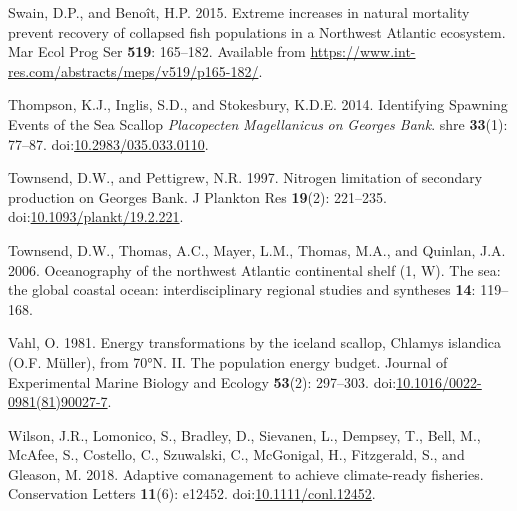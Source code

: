 \documentclass[
]{article}
\newlength{\cslhangindent}
\newlength{\cslentryspacingunit} %
\newenvironment{CSLReferences}[2] %
 {%
  \setlength{\parindent}{0pt}
  \ifodd #1
  \let\oldpar\par
  \def\par{\hangindent=\cslhangindent\oldpar}
  \fi
  \setlength{\parskip}{#2\cslentryspacingunit}
 }%
 {}
\begin{document}
\begin{CSLReferences}{1}{0}
\leavevmode{}%
Swain, D.P., and Benoît, H.P. 2015. Extreme increases in natural mortality prevent recovery of collapsed fish populations in a {Northwest Atlantic} ecosystem. Mar Ecol Prog Ser \textbf{519}: 165--182. Available from \url{https://www.int-res.com/abstracts/meps/v519/p165-182/}.

\leavevmode{}%
Thompson, K.J., Inglis, S.D., and Stokesbury, K.D.E. 2014. Identifying {Spawning Events} of the {Sea Scallop} {\emph{Placopecten}}{ \emph{Magellanicus}}{ \emph{\emph{on}} }{\emph{\emph{Georges Bank}}}. shre \textbf{33}(1): 77--87. doi:\href{https://doi.org/10.2983/035.033.0110}{10.2983/035.033.0110}.

\leavevmode{}%
Townsend, D.W., and Pettigrew, N.R. 1997. Nitrogen limitation of secondary production on {Georges Bank}. J Plankton Res \textbf{19}(2): 221--235. doi:\href{https://doi.org/10.1093/plankt/19.2.221}{10.1093/plankt/19.2.221}.

\leavevmode{}%
Townsend, D.W., Thomas, A.C., Mayer, L.M., Thomas, M.A., and Quinlan, J.A. 2006. Oceanography of the northwest {Atlantic} continental shelf (1, {W}). The sea: the global coastal ocean: interdisciplinary regional studies and syntheses \textbf{14}: 119--168.

\leavevmode{}%
Vahl, O. 1981. Energy transformations by the iceland scallop, {Chlamys} islandica ({O}.{F}. {Müller}), from 70°{N}. {II}. {The} population energy budget. Journal of Experimental Marine Biology and Ecology \textbf{53}(2): 297--303. doi:\href{https://doi.org/10.1016/0022-0981(81)90027-7}{10.1016/0022-0981(81)90027-7}.

\leavevmode{}%
Wilson, J.R., Lomonico, S., Bradley, D., Sievanen, L., Dempsey, T., Bell, M., McAfee, S., Costello, C., Szuwalski, C., McGonigal, H., Fitzgerald, S., and Gleason, M. 2018. Adaptive comanagement to achieve climate-ready fisheries. Conservation Letters \textbf{11}(6): e12452. doi:\href{https://doi.org/10.1111/conl.12452}{10.1111/conl.12452}.

\end{CSLReferences}

\newpage
\end{document}
